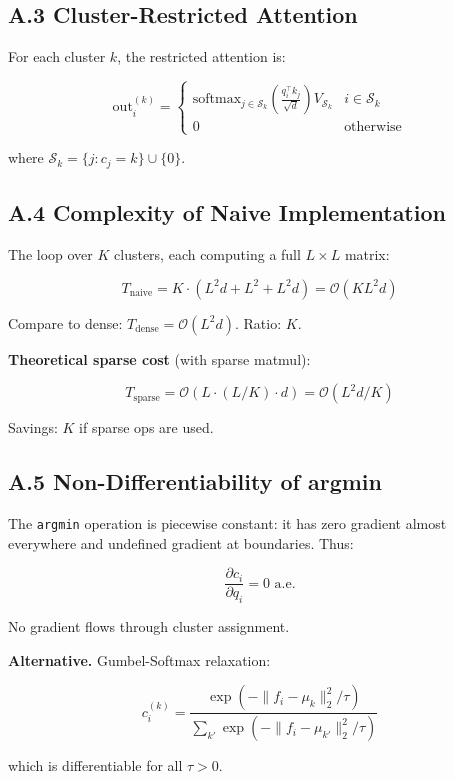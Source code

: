 \subsection{A.3 Cluster-Restricted Attention}

For each cluster $k$, the restricted attention is:

\[
\text{out}_i^{(k)} = \begin{cases} 
\text{softmax}_{j \in \mathcal{S}_k}\!\left(\frac{q_i^\top k_j}{\sqrt{d}}\right) V_{\mathcal{S}_k} & i \in \mathcal{S}_k \\
0 & \text{otherwise}
\end{cases}
\tag{A.3}
\]

where $\mathcal{S}_k = \{j : c_j = k\} \cup \{0\}$.

\subsection{A.4 Complexity of Naive Implementation}

The loop over $K$ clusters, each computing a full $L \times L$ matrix:

\[
T_\text{naive} = K \cdot \left( L^2 d + L^2 + L^2 d \right) = \mathcal{O}(K L^2 d)
\tag{A.4}
\]

Compare to dense: $T_\text{dense} = \mathcal{O}(L^2 d)$. Ratio: $K$.

\textbf{Theoretical sparse cost} (with sparse matmul):

\[
T_\text{sparse} = \mathcal{O}(L \cdot (L/K) \cdot d) = \mathcal{O}(L^2 d / K)
\tag{A.5}
\]

Savings: $K$ if sparse ops are used.

\subsection{A.5 Non-Differentiability of argmin}

The \texttt{argmin} operation is piecewise constant: it has zero gradient almost 
everywhere and undefined gradient at boundaries. Thus:

\[
\frac{\partial c_i}{\partial q_i} = 0 \text{ a.e.}
\tag{A.6}
\]

No gradient flows through cluster assignment.

\textbf{Alternative.} Gumbel-Softmax relaxation:

\[
c_i^{(k)} = \frac{\exp(-\|f_i - \mu_k\|_2^2 / \tau)}{\sum_{k'} \exp(-\|f_i - \mu_{k'}\|_2^2 / \tau)}
\tag{A.7}
\]

which is differentiable for all $\tau > 0$.


